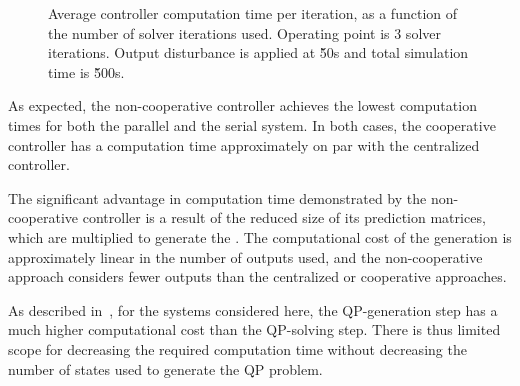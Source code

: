 \begin{figure}
  \resizebox{\linewidth}{!}{%
    
  }
  \caption[Controller computation time per iteration.]{Average controller computation time per iteration, as a function of the number of solver iterations used. Operating point is 3 solver iterations. Output disturbance is applied at \u{50}{s} and total simulation time is \u{500}{s}.}
  \label{fig:results:compcost}
\end{figure}


As expected, the non-cooperative controller achieves the lowest computation times for both the parallel and the serial system.
In both cases, the cooperative controller has a computation time approximately on par with the centralized controller.

The significant advantage in computation time demonstrated by the non-cooperative controller is a result of the reduced size of its prediction matrices, which are multiplied to generate the .
The computational cost of the  generation is approximately linear in the number of outputs used, and the non-cooperative approach considers fewer outputs than the centralized or cooperative approaches.

As described in~\cite{Jones2016}, for the systems considered here, the QP-generation step has a much higher computational cost than the QP-solving step.
There is thus limited scope for decreasing the required computation time without decreasing the number of states used to generate the QP problem.

